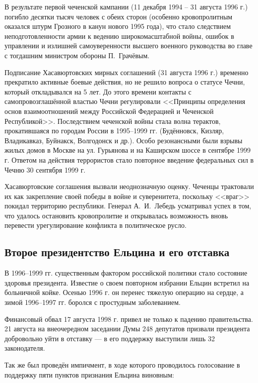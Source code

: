 В результате первой чеченской кампании (11 декабря 1994 -- 31 августа 1996 г.) погибло десятки тысяч человек с обеих сторон (особенно кровопролитным оказался штурм Грозного в канун нового 1995 года), что стало следствием неподготовленности армии к ведению широкомасштабной войны, ошибок в управлении и излишней самоуверенности высшего военного руководства во главе с тогдашним министром обороны П.~Грачёвым. 

Подписание Хасавюртовских мирных соглашений (31 августа 1996 г.) временно прекратило активные боевые действия, но не решило вопроса о статусе Чечни, который откладывался на 5 лет. До этого времени контакты с самопровозглашённой властью Чечни регулировали <<Принципы определения основ взаимоотношений между Российской Федерацией и Чеченской Республикой>>. Последствием чеченской войны стала волна терактов, прокатившаяся по городам России в 1995--1999 гг. (Будённовск, Кизляр, Владикавказ, Буйнакск, Волгодонск и др.). Особо резонансными были взрывы жилых домов в Москве на ул. Гурьянова и на Каширском шоссе в сентябре 1999 г. Ответом на действия террористов стало повторное введение федеральных сил в Чечню 30 сентября 1999 г.

Хасавюртовские соглашения вызвали неоднозначную оценку. Чеченцы трактовали их как закрепление своей победы в войне и суверенитета, поскольку <<враг>> покидал территорию республики. Генерал А.~И.~Лебедь усматривал успех в том, что удалось остановить кровопролитие и открывалась возможность вновь перевести урегулирование конфликта в политическое русло.

\subsection{Второе президентство Ельцина и его отставка}

В 1996--1999 гг. существенным фактором российской политики стало состояние здоровья президента. Известие о своем повторном избрании Ельцин встретил на больничной койке. Осенью 1996 г. он перенес тяжелую операцию на сердце, а зимой 1996--1997 гг. боролся с простудным заболеванием.

Финансовый обвал 17 августа 1998 г. привел не только к падению правительства. 21 августа на внеочередном заседании Думы 248 депутатов призвали президента добровольно уйти в отставку --- в его поддержку выступили лишь 32 законодателя.

Так же был проведён импичмент, в ходе которого проводилось голосование в поддержку пяти пунктов признания Ельцина виновным: 

